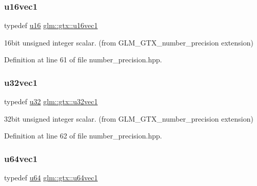 \subsubsection{\texorpdfstring{u16vec1}{u16vec1}}
{\footnotesize\ttfamily typedef \hyperlink{group__gtc__type__precision_gae7a1571503f83d2264ddfa705a6b082a}{u16} \hyperlink{group__gtx__number__precision_ga807d7e5f24e981b1575bd40ca159781d}{glm\+::gtx\+::u16vec1}}



16bit unsigned integer scalar. (from G\+L\+M\+\_\+\+G\+T\+X\+\_\+number\+\_\+precision extension) 



Definition at line 61 of file number\+\_\+precision.\+hpp.

\mbox{\label{group__gtx__number__precision_gac46a7890b20928df83e734c3ea9557d4}} 
\subsubsection{\texorpdfstring{u32vec1}{u32vec1}}
{\footnotesize\ttfamily typedef \hyperlink{group__gtc__type__precision_ga54e837745059fd29017bed71cfa0a8db}{u32} \hyperlink{group__gtx__number__precision_gac46a7890b20928df83e734c3ea9557d4}{glm\+::gtx\+::u32vec1}}



32bit unsigned integer scalar. (from G\+L\+M\+\_\+\+G\+T\+X\+\_\+number\+\_\+precision extension) 



Definition at line 62 of file number\+\_\+precision.\+hpp.

\mbox{\label{group__gtx__number__precision_ga92812a1d7e746bcaba61d2f5a64afc52}} 
\subsubsection{\texorpdfstring{u64vec1}{u64vec1}}
{\footnotesize\ttfamily typedef \hyperlink{group__gtc__type__precision_ga71cedd4972f9cb1a5e14dfe5ab83ecd7}{u64} \hyperlink{group__gtx__number__precision_ga92812a1d7e746bcaba61d2f5a64afc52}{glm\+::gtx\+::u64vec1}}



